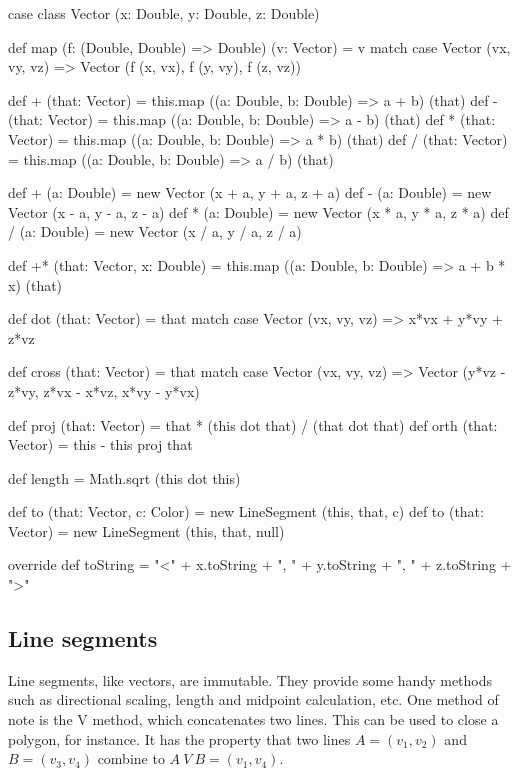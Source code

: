 \documentclass{article}
\begin{document}
      \begin{scalacode}
case class Vector (x: Double, y: Double, z: Double) {
  def map (f: (Double, Double) => Double) (v: Vector) = v match {
    case Vector (vx, vy, vz) => Vector (f (x, vx), f (y, vy), f (z, vz))}

  def + (that: Vector) = this.map ((a: Double, b: Double) => a + b) (that)
  def - (that: Vector) = this.map ((a: Double, b: Double) => a - b) (that)
  def * (that: Vector) = this.map ((a: Double, b: Double) => a * b) (that)
  def / (that: Vector) = this.map ((a: Double, b: Double) => a / b) (that)

  def + (a: Double) = new Vector (x + a, y + a, z + a)
  def - (a: Double) = new Vector (x - a, y - a, z - a)
  def * (a: Double) = new Vector (x * a, y * a, z * a)
  def / (a: Double) = new Vector (x / a, y / a, z / a)

  def +* (that: Vector, x: Double) = this.map ((a: Double, b: Double) => a + b * x) (that)

  def dot (that: Vector) = that match {
    case Vector (vx, vy, vz) => x*vx + y*vy + z*vz}

  def cross (that: Vector) = that match {
    case Vector (vx, vy, vz) => Vector (y*vz - z*vy, z*vx - x*vz, x*vy - y*vx)}

  def proj (that: Vector) = that * (this dot that) / (that dot that)
  def orth (that: Vector) = this - this proj that

  def length = Math.sqrt (this dot this)

  def to (that: Vector, c: Color) = new LineSegment (this, that, c)
  def to (that: Vector)           = new LineSegment (this, that, null)

  override def toString = "<" + x.toString + ", " + y.toString + ", " + z.toString + ">"
}
      \end{scalacode}

    \subsection{Line segments}
      \label{sec:line-segments}

      Line segments, like vectors, are immutable. They provide some handy methods such as directional scaling, length and midpoint calculation, etc. One method
      of note is the V method, which concatenates two lines. This can be used to close a polygon, for instance. It has the property that two lines $A = (v_1,
      v_2)$ and $B = (v_3, v_4)$ combine to $A~V~B = (v_1, v_4)$.
\end{document}
